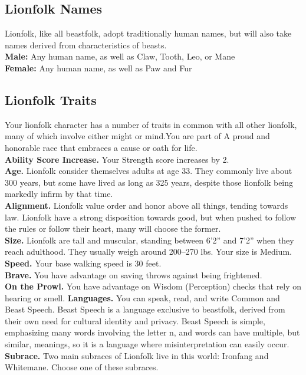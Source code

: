 \documentclass[10pt,twoside,twocolumn,openany]{book}
\begin{document}
\subsection{Lionfolk Names}

Lionfolk, like all beastfolk, adopt traditionally human names, but will also take names derived from characteristics of beasts.\\
\textbf{Male:} Any human name, as well as Claw, Tooth, Leo, or Mane\\
\textbf{Female:} Any human name, as well as Paw and Fur\\

\subsection{Lionfolk Traits}

Your lionfolk character has a number of traits in common with all other lionfolk, many of which involve either might or mind.You are part of A proud and honorable race that embraces a cause or oath for life. \\
\indent \textbf{Ability Score Increase.} Your Strength score increases by 2.\\
\indent \textbf{Age.} Lionfolk consider themselves adults at age 33. They commonly live about 300 years, but some have lived as long as 325 years, despite those lionfolk being markedly infirm by that time. \\
\indent \textbf{Alignment.} Lionfolk value order and honor above all things, tending towards law. Lionfolk have a strong disposition towards good, but when pushed to follow the rules or follow their heart, many will choose the former.\\
\indent \textbf{Size.}  Lionfolk are tall and muscular, standing between 6'2” and 7'2” when they reach adulthood. They usually weigh around 200–270 lbs. Your size is Medium.\\
\indent \textbf{Speed.} Your base walking speed is 30 feet.\\
\indent \textbf{Brave.} You have advantage on saving throws against being frightened.\\
\indent \textbf{On the Prowl.} You have advantage on Wisdom (Perception) checks that rely on hearing or smell.
\indent \textbf{Languages.} You can speak, read, and write Common and Beast Speech. Beast Speech is a language exclusive to beastfolk, derived from their own need for cultural identity and privacy. Beast Speech is simple, emphasizing many words involving the letter n, and words can have multiple, but similar, meanings, so it is a language where misinterpretation can easily occur.\\
\indent \textbf{Subrace.} Two main subraces of Lionfolk live in this world: Ironfang and Whitemane. Choose one of these subraces.
\end{document}
